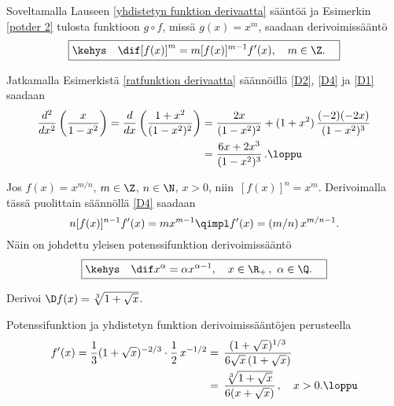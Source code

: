 Soveltamalla Lauseen \ref{yhdistetyn funktion derivaatta} sääntöä ja Esimerkin \ref{potder 2}
tulosta funktioon $g\circ f$, missä $g(x)=x^m$, saadaan derivoimissääntö
\begin{equation} \label{D4}
\boxed{\kehys\quad \dif[f(x)]^m=m[f(x)]^{m-1}f'(x),\quad m\in\Z. \quad}
\end{equation}
\begin{Exa} Jatkamalla Esimerkistä \ref{ratfunktion derivaatta} säännöillä \eqref{D2},
\eqref{D4} ja \eqref{D1} saadaan
\begin{align*}
\frac{d^2}{dx^2}\left(\frac{x}{1-x^2}\right)=\frac{d}{dx}\left(\frac{1+x^2}{(1-x^2)^2}\right) 
                   &=\frac{2x}{(1-x^2)^2}+(1+x^2)\,\frac{(-2)(-2x)}{(1-x^2)^3} \\
                   &=\frac{6x+2x^3}{(1-x^2)^3}\,. \loppu
\end{align*}
\end{Exa}
Jos $f(x)=x^{m/n}$, $m\in\Z$, $n\in\N$, $x>0$, niin $\,[f(x)]^n=x^m$. Derivoimalla tässä
puolittain säännöllä \eqref{D4} saadaan
\[
n[f(x)]^{n-1}f'(x) = mx^{m-1} \qimpl f'(x) = (m/n)\,x^{m/n-1}.
\]
Näin on johdettu yleisen potenssifunktion derivoimissääntö
\[ 
\boxed{\kehys\quad \dif x^\alpha = \alpha x^{\alpha-1}, \quad x\in\R_+\,, \ \alpha\in\Q. \quad}
\]

\begin{Exa} Derivoi $\D f(x) = \sqrt[3]{1+\sqrt{x}}$. \end{Exa}
\ratk Potenssifunktion ja yhdistetyn funktion derivoimissääntöjen perusteella
\begin{align*}
f'(x) = \frac{1}{3}(1+\sqrt{x})^{-2/3}\cdot\frac{1}{2}\,x^{-1/2}
      &=\,\frac{(1+\sqrt{x})^{1/3}}{6\sqrt{x}\,(1+\sqrt{x})} \\
      &=\,\frac{\sqrt[3]{1+\sqrt{x}}}{6(x+\sqrt{x})}\,, \quad x>0. \loppu
\end{align*}

